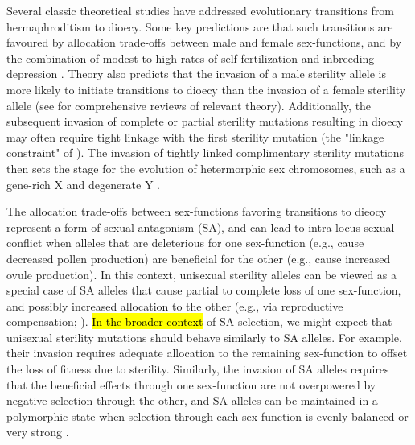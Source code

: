\documentclass[9pt,twocolumn,twoside,lineno]{gsajnl}
\begin{document}
Several classic theoretical studies have addressed evolutionary transitions from hermaphroditism to dioecy. Some key predictions are that such transitions are favoured by allocation trade-offs between male and female sex-functions, and by the combination of modest-to-high rates of self-fertilization and inbreeding depression \citep{Lewis1941,Lloyd1975,Lloyd1976,Charlesworth1978a}. Theory also predicts that the invasion of a male sterility allele is more likely to initiate transitions to dioecy than the invasion of a female sterility allele (see \citealt{Charlesworth1999,Charlesworth2006} for comprehensive reviews of relevant theory). Additionally, the subsequent invasion of complete or partial sterility mutations resulting in dioecy may often require tight linkage with the first sterility mutation (the "linkage constraint" of \citealt{Charlesworth1978a}). The invasion of tightly linked complimentary sterility mutations then sets the stage for the evolution of hetermorphic sex chromosomes, such as a gene-rich X and degenerate Y \citep{Rice1987,Bachtrog2006,Charlesworth2002,Qiuetal2013}. 

The allocation trade-offs between sex-functions favoring transitions to dieocy represent a form of sexual antagonism (SA), and can lead to intra-locus sexual conflict when alleles that are deleterious for one sex-function (e.g., cause decreased pollen production) are beneficial for the other (e.g., cause increased ovule production). In this context, unisexual sterility alleles can be viewed as a special case of SA alleles that cause partial to complete loss of one sex-function, and possibly increased allocation to the other (e.g., via reproductive compensation; \citealt{Lewis1941,Lloyd1975,Charlesworth1978a}). \hl{In the broader context} of SA selection, we might expect that unisexual sterility mutations should behave similarly to SA alleles. For example, their invasion requires adequate allocation to the remaining sex-function to offset the loss of fitness due to sterility. Similarly, the invasion of SA alleles requires that the beneficial effects through one sex-function are not overpowered by negative selection through the other, and SA alleles can be maintained in a polymorphic state when selection through each sex-function is evenly balanced or very strong \citep{Kidwell1977,Charlesworth1978a,JordanConnallon2014}. 
\end{document}
